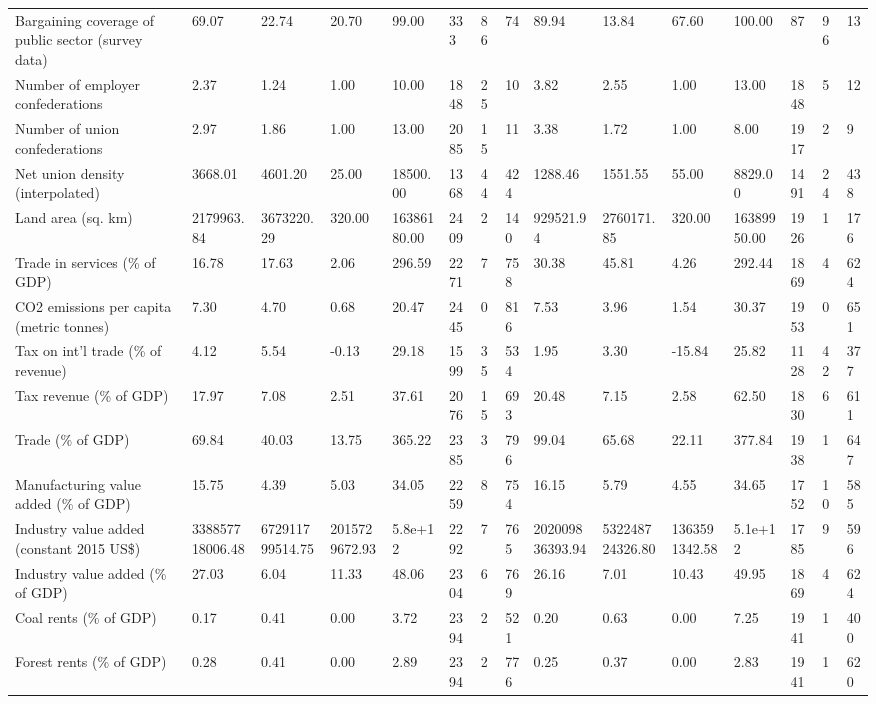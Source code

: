 \begin{longtable}{lllllllllllllll}
\addlinespace
Bargaining coverage of public sector (survey data) & 69.07 & 22.74 & 20.70 & 99.00 & 333 & 86 & 74 & 89.94 & 13.84 & 67.60 & 100.00 & 87 & 96 & 13\\
Number of employer confederations & 2.37 & 1.24 & 1.00 & 10.00 & 1848 & 25 & 10 & 3.82 & 2.55 & 1.00 & 13.00 & 1848 & 5 & 12\\
Number of union confederations & 2.97 & 1.86 & 1.00 & 13.00 & 2085 & 15 & 11 & 3.38 & 1.72 & 1.00 & 8.00 & 1917 & 2 & 9\\
Net union density (interpolated) & 3668.01 & 4601.20 & 25.00 & 18500.00 & 1368 & 44 & 424 & 1288.46 & 1551.55 & 55.00 & 8829.00 & 1491 & 24 & 438\\
Land area (sq. km) & 2179963.84 & 3673220.29 & 320.00 & 16386180.00 & 2409 & 2 & 140 & 929521.94 & 2760171.85 & 320.00 & 16389950.00 & 1926 & 1 & 176\\
\addlinespace
Trade in services (\% of GDP) & 16.78 & 17.63 & 2.06 & 296.59 & 2271 & 7 & 758 & 30.38 & 45.81 & 4.26 & 292.44 & 1869 & 4 & 624\\
CO2 emissions per capita (metric tonnes) & 7.30 & 4.70 & 0.68 & 20.47 & 2445 & 0 & 816 & 7.53 & 3.96 & 1.54 & 30.37 & 1953 & 0 & 651\\
Tax on int'l trade (\% of revenue) & 4.12 & 5.54 & -0.13 & 29.18 & 1599 & 35 & 534 & 1.95 & 3.30 & -15.84 & 25.82 & 1128 & 42 & 377\\
Tax revenue (\% of GDP) & 17.97 & 7.08 & 2.51 & 37.61 & 2076 & 15 & 693 & 20.48 & 7.15 & 2.58 & 62.50 & 1830 & 6 & 611\\
Trade (\% of GDP) & 69.84 & 40.03 & 13.75 & 365.22 & 2385 & 3 & 796 & 99.04 & 65.68 & 22.11 & 377.84 & 1938 & 1 & 647\\
\addlinespace
Manufacturing value added (\% of GDP) & 15.75 & 4.39 & 5.03 & 34.05 & 2259 & 8 & 754 & 16.15 & 5.79 & 4.55 & 34.65 & 1752 & 10 & 585\\
Industry value added (constant 2015 US\$) & 338857718006.48 & 672911799514.75 & 2015729672.93 & 5.8e+12 & 2292 & 7 & 765 & 202009836393.94 & 532248724326.80 & 1363591342.58 & 5.1e+12 & 1785 & 9 & 596\\
Industry value added (\% of GDP) & 27.03 & 6.04 & 11.33 & 48.06 & 2304 & 6 & 769 & 26.16 & 7.01 & 10.43 & 49.95 & 1869 & 4 & 624\\
Coal rents (\% of GDP) & 0.17 & 0.41 & 0.00 & 3.72 & 2394 & 2 & 521 & 0.20 & 0.63 & 0.00 & 7.25 & 1941 & 1 & 400\\
Forest rents (\% of GDP) & 0.28 & 0.41 & 0.00 & 2.89 & 2394 & 2 & 776 & 0.25 & 0.37 & 0.00 & 2.83 & 1941 & 1 & 620\\

\end{longtable}
